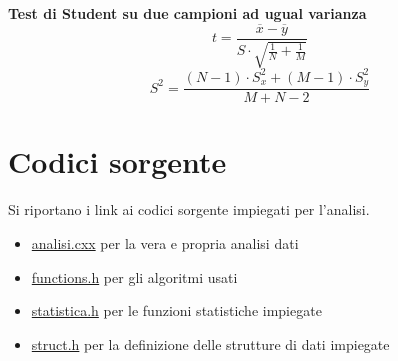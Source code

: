 \documentclass[a4paper,11pt,oneside]{article}
\begin{document}
\textbf{Test di Student su due campioni ad ugual varianza}\\
\begin{equation*}
    t=\frac{\overline{x}-\overline{y}}{S\cdot \sqrt{\frac{1}{N}+\frac{1}{M}}}
\end{equation*}
\begin{equation*}
    S^2=\frac{(N-1)\cdot S_{x}^2+(M-1)\cdot S_{y}^2}{M+N-2}
\end{equation*}

\section{Codici sorgente}
Si riportano i link ai codici sorgente impiegati per l'analisi.
\begin{itemize}
    \item \href{https://github.com/badbigota/6_relazione/blob/master/Programmi/analisi.cxx}{analisi.cxx} per la vera e propria analisi dati 
    \item \href{https://github.com/badbigota/6_relazione/blob/master/Programmi/functions.h}{functions.h} per gli algoritmi usati
    \item \href{https://github.com/badbigota/6_relazione/blob/master/Programmi/statistica.h}{statistica.h} per le funzioni statistiche impiegate
    \item\href{https://github.com/badbigota/6_relazione/blob/master/Programmi/struct.h}{struct.h} per la definizione delle strutture di dati impiegate
\end{itemize}
\end{document}
